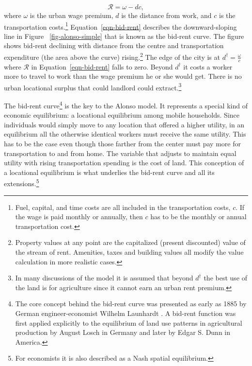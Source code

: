 \begin{equation}  
\mathcal{R}= \omega - dc, \label{eqn-bid-rent}\end{equation} 
where $\omega$ is the \gls{urban wage premium}, $d$ is the distance from work, and $c$ is the transportation costs.\footnote{Fuel, capital, and time costs are all included in the transportation costs, ${c}$.  If the wage is paid monthly or annually, then $c$ has to be the monthly or annual transportation cost.} Equation~\ref{eqn-bid-rent} describes the downward-sloping line in Figure ~\ref{fig-alonso-simple} that is known as the bid-rent curve. The figure  shows bid-rent declining with distance from the centre and transportation expenditure (the area above the curve)  rising.\footnote{Property values  at any point are the capitalized (present discounted) value of the stream of rent. Amenities, taxes and building values all modify the value calculation in more realistic cases.}  The edge of the city is at  $d^\dagger= \frac{\omega}{c}$ where $\mathcal{R}$ in Equation~\ref{eqn-bid-rent} falls to zero. 
Beyond $d^\dagger$ it costs a worker more to travel to work than the wage premium  he or she would get.  There is no urban locational surplus that could landlord could extract.\footnote{In many discussions of the model it is assumed that beyond $d^\dagger$ the best use of the land is for agriculture since it cannot earn an urban rent premium. } 


 The \gls{bid-rent curve}\footnote{The core concept behind the bid-rent curve was presented as early as 1885  by German engineer-economist Wilhelm Launhardt \cite{blaugEconomicTheoryRetrospect1985, launhardtMathematischeBegruendungVolkswirthschaftslehre1885}. A \gls{bid-rent function} was first applied explicitly to the equilibrium of land use patterns in agricultural production by August Losch \cite{loschEconomicsLocation1954} in Germany and later by Edgar S. Dunn \cite{dunnEquilibriumLandUsePatterns1954} in America. } is the key to the Alonso model. It represents a special kind of economic equilibrium:   a locational equilibrium among mobile households. Since individuals would simply move to any location that offered a higher utility, in an equilibrium all the otherwise identical workers must receive the same utility. This has to be the case even though those farther from the center must pay more for transportation to and from home. The variable that adjusts to maintain equal utility with rising transportation spending is the cost of land. This conception of a \gls{locational equilibrium} is what underlies the bid-rent curve and all its extensions.\footnote{For economists it is also described as a Nash spatial equilibrium.}



